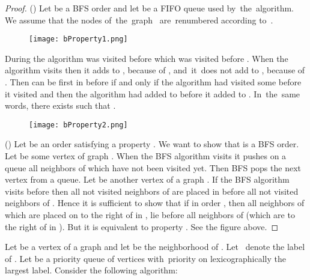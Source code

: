 \documentclass[a4paper, 11pt]{article}
\begin{document}
\begin{proof}
    ()
    Let  be a BFS order and let  be a FIFO queue used by~the~algorithm. We assume 
    that the nodes of~the~graph~ are~renumbered according to~. 
   
    \begin{figure}[h]
        \begin{center}
            \texttt{[image: bProperty1.png]}
        \end{center}
    \end{figure}

    During the algorithm  was visited before  which was visited before .
    When the algorithm visits  then it adds  to , because of , 
    and~it~does not add  to , because of . Then  can be first in  
    before  if and only if the algorithm had visited some  before it visited  
    and  then the algorithm had added  to  before it added  to .
    In~the~same words, there exists  such that .

    \begin{figure}[h]
        \begin{center}
            \texttt{[image: bProperty2.png]}
        \end{center}
    \end{figure}

    ()
    Let  be an order satisfying a property . We want to show that  is
    a BFS order. Let  be some vertex of graph . When the BFS algorithm visits  
    it pushes on a queue all neighbors of  which have not been visited yet. Then
    BFS pops the next vertex from a queue. Let  be another vertex of a graph . If the 
    BFS algorithm visits  before  then all not visited neighbors of  are placed 
    in  before all not visited neighbors of . Hence it is sufficient to show 
    that if  in order , then all neighbors of  which are placed on to the
    right of  in , lie before all neighbors of  (which are to the right of 
    in ). But it is equivalent to property . See the figure above.
    
\end{proof}

Let  be a vertex of a graph  and let  be the neighborhood of . Let~ 
denote the label of . Let  be a priority queue of vertices with~priority on 
lexicographically the largest label. Consider the following algorithm:\\
\end{document}
